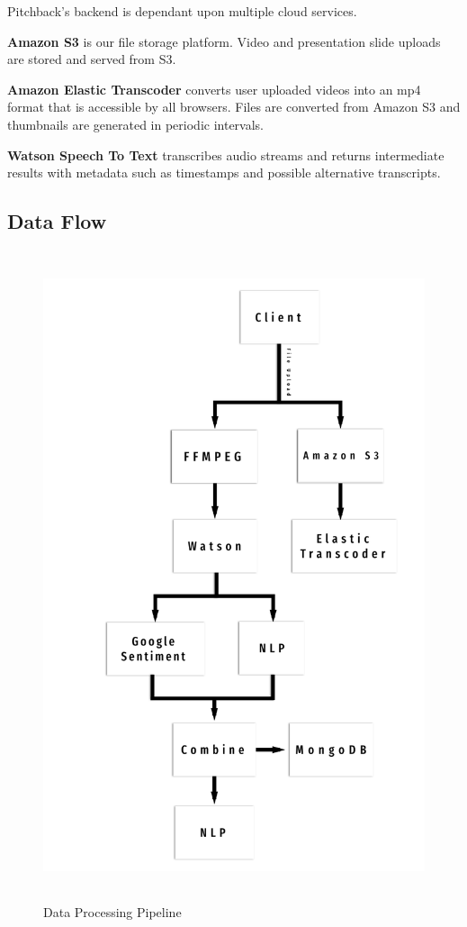 Pitchback’s backend is dependant upon multiple cloud services.
 
\textbf{Amazon S3} is our file storage platform. Video and presentation slide
uploads are stored and served from S3.
 
\textbf{Amazon Elastic Transcoder} converts user uploaded videos into an mp4
format that is accessible by all browsers. Files are converted from Amazon S3
and thumbnails are generated in periodic intervals.
 
\textbf{Watson Speech To Text} transcribes audio streams and returns
intermediate results with metadata such as timestamps and possible alternative
transcripts.

\subsection*{Data Flow}

\begin{figure}[H]
  \centering
   \includegraphics[height=7.5in]{figures/data_flow}
   \caption{Data Processing Pipeline}
\end{figure}

